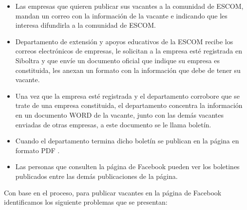 \begin{itemize}
    \item Las empresas que quieren publicar sus vacantes a la comunidad de ESCOM, mandan un correo con la información de la vacante e indicando que les interesa difundirla a la comunidad de ESCOM.

    \item Departamento de extensión y apoyos educativos de la ESCOM recibe los correos electrónicos de empresas, le solicitan a la empresa esté registrada en Siboltra y que envíe un documento oficial que indique su empresa es constituida, les anexan un formato con la información que debe de tener su vacante. 

    \item Una vez que la empresa esté registrada y el departamento corrobore que se trate de una empresa constituida, el departamento concentra la información en un documento WORD de la vacante, junto con las demás vacantes enviadas de otras empresas, a este documento se le llama boletín.

    \item Cuando el departamento termina dicho boletín se publican en la página en formato PDF .

    \item Las personas que consulten la página de Facebook pueden ver los boletines publicados entre las demás publicaciones de la página. 
\end{itemize}
Con base en el proceso, para publicar vacantes en la página de Facebook identificamos los siguiente problemas que se presentan:
